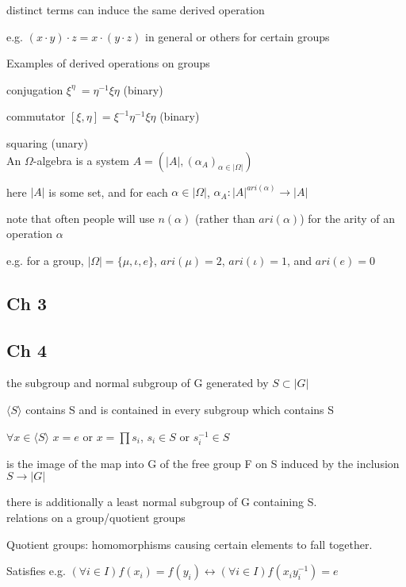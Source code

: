 \documentclass[12pt]{article}
\begin{document}
distinct terms can induce the same derived operation

e.g. $(x \cdot y) \cdot z = x \cdot (y \cdot z)$ in general or others for certain groups

\noindent
Examples of derived operations on groups

conjugation $\xi^{\eta}\ = \eta^{-1}\xi\eta$ (binary)

commutator $[\xi, \eta] = \xi^{-1}\eta^{-1}\xi\eta$ (binary)

squaring (unary)\\

\noindent
An $\Omega$-algebra is a system $A = (|A|, (\alpha_A)_{\alpha \in |\Omega|})$

here $|A|$ is some set, and for each $\alpha \in |\Omega|$, $\alpha_A : |A|^{ari(\alpha)} \to |A|$

note that often people will use $n(\alpha)$ (rather than $ari(\alpha)$) for the arity of an operation $\alpha$

e.g. for a group, $|\Omega| = \{\mu, \iota, e\}$, $ari(\mu) = 2$, $ari(\iota) = 1$, and $ari(e) = 0$

\subsection{Ch 3}

\subsection{Ch 4}

\noindent
the subgroup and normal subgroup of G generated by $S \subset |G|$

$\langle S \rangle$ contains S and is contained in every subgroup which contains S

$\forall x \in \langle S \rangle$ $x = e$ or $x = \prod s_i$, $s_i \in S$ or $s_i^{-1} \in S$

is the image of the map into G of the free group F on S induced by the inclusion $S \to |G|$

there is additionally a least normal subgroup of G containing S.\\

\noindent relations on a group/quotient groups

Quotient groups: homomorphisms causing certain elements to fall together.

Satisfies e.g. $(\forall i \in I) f(x_i) = f(y_i) \leftrightarrow (\forall i \in I) f(x_iy_i^{-1}) = e$
\end{document}
